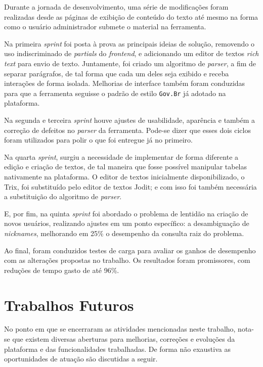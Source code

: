Durante a jornada de desenvolvimento, uma série de modificações foram realizadas desde as páginas de exibição de conteúdo do texto até mesmo na forma como o usuário administrador submete o material na ferramenta.

Na primeira \textit{sprint} foi posta à prova as principais ideias de solução, removendo o uso indiscriminado de \textit{partials} do \textit{frontend}, e adicionando um editor de textos \textit{rich text} para envio de texto.
Juntamente, foi criado um algoritmo de \textit{parser}, a fim de separar parágrafos, de tal forma que cada um deles seja exibido e receba interações de forma isolada.
Melhorias de interface também foram conduzidas para que a ferramenta seguisse o padrão de estilo \texttt{Gov.Br} já adotado na plataforma.

Na segunda e terceira \textit{sprint} houve ajustes de usabilidade, aparência e também a correção de defeitos no \textit{parser} da ferramenta.
Pode-se dizer que esses dois ciclos foram utilizados para polir o que foi entregue já no primeiro.

Na quarta \textit{sprint}, surgiu a necessidade de implementar de forma diferente a edição e criação de textos, de tal maneira que fosse possível manipular tabelas nativamente na plataforma.
O editor de textos inicialmente disponibilizado, o Trix, foi substituído pelo editor de textos Jodit; e com isso foi também necessária a substituição do algoritmo de \textit{parser}.

E, por fim, na quinta \textit{sprint} foi abordado o problema de lentidão na criação de novos usuários, realizando ajustes em um ponto específico: a desambiguação de \textit{nicknames}, melhorando em 25\% o desempenho da consulta raiz do problema.

Ao final, foram conduzidos testes de carga para avaliar os ganhos de desempenho com as alterações propostas no trabalho.
Os resultados foram promissores, com reduções de tempo gasto de até 96\%.

\section {Trabalhos Futuros}
\label{sec:trabalhos-futuros}

No ponto em que se encerraram as atividades mencionadas neste trabalho, nota-se que existem diversas aberturas para melhorias, correções e evoluções da plataforma e das funcionalidades trabalhadas.
De forma não exaustiva as oportunidades de atuação são discutidas a seguir.

